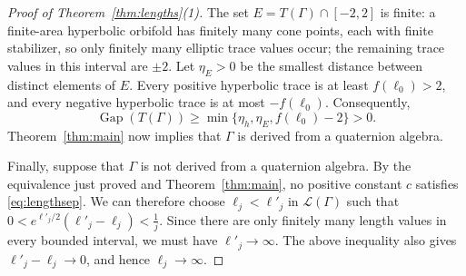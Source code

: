\documentclass[reqno]{amsart}
\theoremstyle{remark}
\DeclareMathOperator{\Gap}{Gap}
\begin{document}
\begin{proof}[Proof of Theorem~\ref{thm:lengths}(1)]
The set $E=T(\Gamma)\cap[-2,2]$ is finite: a finite-area hyperbolic orbifold has finitely many cone points, each with finite stabilizer, so only finitely many elliptic trace values occur; the remaining trace values in this interval are $\pm2$. Let $\eta_E>0$ be the smallest distance between distinct elements of $E$. Every positive hyperbolic trace is at least $f(\ell_0)>2$, and every negative hyperbolic trace is at most $-f(\ell_0)$. Consequently,
$$
\Gap(T(\Gamma))
\ge \min\{\eta_h,\eta_E,f(\ell_0)-2\}>0.
$$
Theorem~\ref{thm:main} now implies that $\Gamma$ is derived from a quaternion algebra.

Finally, suppose that $\Gamma$ is not derived from a quaternion algebra. By the equivalence just proved and Theorem~\ref{thm:main}, no positive constant $c$ satisfies \eqref{eq:lengthsep}. We can therefore choose $\ell_j<\ell'_j$ in $\mathcal L(\Gamma)$ such that $0<e^{\ell'_j/2}(\ell'_j-\ell_j)<\frac1j$. Since there are only finitely many length values in every bounded interval, we must have $\ell'_j\to\infty$. The above inequality also gives $\ell'_j-\ell_j\to0$, and hence $\ell_j\to\infty$.
\end{proof}
\end{document}
